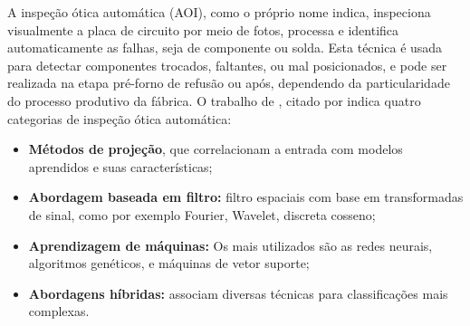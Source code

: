 A inspeção ótica automática (AOI), como o próprio nome indica, inspeciona visualmente a placa de circuito por meio de fotos, processa e identifica automaticamente as falhas, seja de componente ou solda. Esta técnica é usada para detectar componentes trocados, faltantes, ou mal posicionados, e pode ser realizada na etapa pré-forno de refusão ou após, dependendo da particularidade do processo produtivo da fábrica. O trabalho de \cite{huang2015automated}, citado por \cite{mello2015sistema} indica quatro categorias de inspeção ótica automática:

\begin{itemize}
    \item \textbf{Métodos de projeção}, que correlacionam a entrada com modelos aprendidos e suas características;
    \item \textbf{Abordagem baseada em filtro:} filtro espaciais com base em transformadas de sinal, como por exemplo Fourier, Wavelet, discreta cosseno;
    \item \textbf{Aprendizagem de máquinas:} Os mais utilizados são as redes neurais, algoritmos genéticos, e máquinas de vetor suporte;
    \item \textbf{Abordagens híbridas:} associam diversas técnicas para classificações mais complexas. 
\end{itemize}



